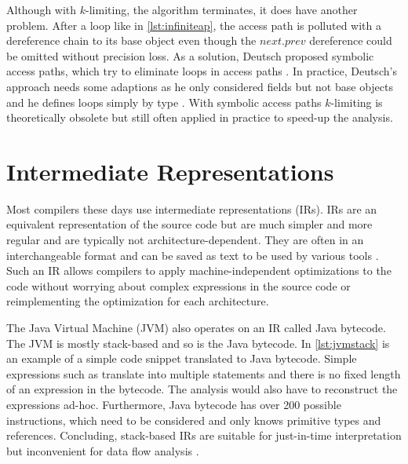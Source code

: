 \documentclass[../draft.tex]{subfiles}
\begin{document}
    Although with $k$-limiting, the algorithm terminates, it does have another problem. 
    After a loop like in \autoref{lst:infiniteap}, the access path is polluted with a dereference chain to its base object even though the $next.prev$ dereference could be omitted without precision loss. 
    As a solution, Deutsch proposed symbolic access paths, which try to eliminate loops in access paths \cite{Deutsch1994}. 
    In practice, Deutsch's approach needs some adaptions as he only considered fields but not base objects and he defines loops simply by type \cite{Arzt2017PhD}. 
    With symbolic access paths $k$-limiting is theoretically obsolete but still often applied in practice to speed-up the analysis.

    \section{Intermediate Representations}\label{s:jimple}
    Most compilers these days use intermediate representations (IRs). 
    IRs are an equivalent representation of the source code but are much simpler and more regular and are typically not architecture-dependent. 
    They are often in an interchangeable format and can be saved as text to be used by various tools \cite{Thain2019}.
    Such an IR allows compilers to apply machine-independent optimizations to the code without worrying about complex expressions in the source code or reimplementing the optimization for each architecture. 

    The Java Virtual Machine (JVM) also operates on an IR called Java bytecode. 
    The JVM is mostly stack-based and so is the Java bytecode. 
    In \autoref{lst:jvmstack} is an example of a simple code snippet translated to Java bytecode. 
    Simple expressions such as  translate into multiple statements and there is no fixed length of an expression in the bytecode. 
    The analysis would also have to reconstruct the expressions ad-hoc. 
    Furthermore, Java bytecode has over 200 possible instructions\footnotemark{}, which need to be considered and only knows primitive types and references. 
    Concluding, stack-based IRs are suitable for just-in-time interpretation but inconvenient for data flow analysis \cite{Valleerai2004}.
\end{document}
